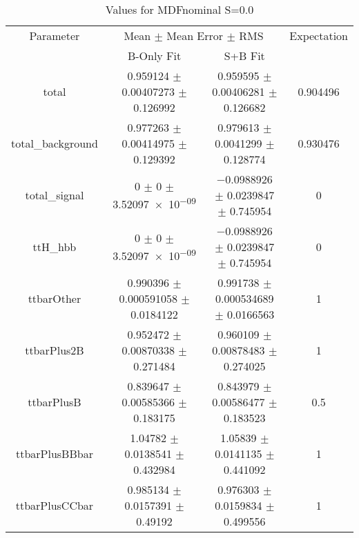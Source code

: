 \begin{table}
\centering
\caption{Values for MDFnominal S=0.0}
\begin{tabular}{cccc}
\toprule
Parameter & \multicolumn{2}{c}{Mean $\pm$ Mean Error $\pm$ RMS} & Expectation\\
 & B-Only Fit & S+B Fit & \\
\midrule
total & \num{0.959124} $\pm$ \num{0.00407273} $\pm$ \num{0.126992} & \num{0.959595} $\pm$ \num{0.00406281} $\pm$ \num{0.126682} & \num{0.904496}\\
total\_background & \num{0.977263} $\pm$ \num{0.00414975} $\pm$ \num{0.129392} & \num{0.979613} $\pm$ \num{0.0041299} $\pm$ \num{0.128774} & \num{0.930476}\\
total\_signal & \num{0} $\pm$ \num{0} $\pm$ \num{3.52097e-09} & \num{-0.0988926} $\pm$ \num{0.0239847} $\pm$ \num{0.745954} & \num{0}\\
ttH\_hbb & \num{0} $\pm$ \num{0} $\pm$ \num{3.52097e-09} & \num{-0.0988926} $\pm$ \num{0.0239847} $\pm$ \num{0.745954} & \num{0}\\
ttbarOther & \num{0.990396} $\pm$ \num{0.000591058} $\pm$ \num{0.0184122} & \num{0.991738} $\pm$ \num{0.000534689} $\pm$ \num{0.0166563} & \num{1}\\
ttbarPlus2B & \num{0.952472} $\pm$ \num{0.00870338} $\pm$ \num{0.271484} & \num{0.960109} $\pm$ \num{0.00878483} $\pm$ \num{0.274025} & \num{1}\\
ttbarPlusB & \num{0.839647} $\pm$ \num{0.00585366} $\pm$ \num{0.183175} & \num{0.843979} $\pm$ \num{0.00586477} $\pm$ \num{0.183523} & \num{0.5}\\
ttbarPlusBBbar & \num{1.04782} $\pm$ \num{0.0138541} $\pm$ \num{0.432984} & \num{1.05839} $\pm$ \num{0.0141135} $\pm$ \num{0.441092} & \num{1}\\
ttbarPlusCCbar & \num{0.985134} $\pm$ \num{0.0157391} $\pm$ \num{0.49192} & \num{0.976303} $\pm$ \num{0.0159834} $\pm$ \num{0.499556} & \num{1}\\
\bottomrule
\end{tabular}
\end{table}